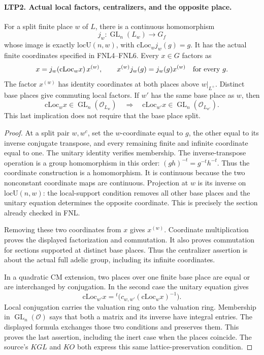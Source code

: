 \paragraph{LTP2. Actual local factors, centralizers, and the opposite place.}
\label{claim:LTP2}
For a split finite place \(w\) of \(L\), there is a continuous
homomorphism
\[
       j_w:\operatorname{GL}_n(L_w)\longrightarrow G_f
\]
whose image is exactly \(\mathrm{locU}(n,w)\), with
\(\mathrm{cLoc}_w j_w(g)=g\).  It has the actual finite coordinates
specified in FNL4--FNL6.  Every \(x\in G\) factors as
\[
       x=j_w(\mathrm{cLoc}_w x)\,x^{(w)},
             \qquad x^{(w)}j_w(g)=j_w(g)x^{(w)}
                                     \quad\hbox{for every }g.
\]
The factor \(x^{(w)}\) has identity coordinates at both places above
\(w|_{L^+}\).  Distinct base places give commuting local factors.
If \(w'\) has the same base place as \(w\), then
\[
 \mathrm{cLoc}_w x\in\operatorname{GL}_n(\mathcal O_{L_w})
 \quad\Longrightarrow\quad
 \mathrm{cLoc}_{w'}x\in\operatorname{GL}_n(\mathcal O_{L_{w'}}).
\]
This last implication does not require that the base place split.
\begin{proof}
At a split pair \(w,w^c\), set the \(w\)-coordinate equal to \(g\),
the other equal to its inverse conjugate transpose, and every
remaining finite and infinite coordinate equal to one.  The unitary
identity verifies membership.  The inverse-transpose operation is
a group homomorphism in this order:
\((gh)^{-t}=g^{-t}h^{-t}\).  Thus the coordinate construction is a
homomorphism.  It is continuous because the two nonconstant
coordinate maps are continuous.  Projection at \(w\) is its inverse
on \(\mathrm{locU}(n,w)\): the local-support condition removes all
other base places and the unitary equation determines the opposite
coordinate.  This is precisely the section already checked in FNL.

Removing these two coordinates from \(x\) gives \(x^{(w)}\).
Coordinate multiplication proves the displayed factorization and
commutation.  It also proves commutation for sections supported at
distinct base places.  Thus the centralizer assertion is about the
actual full adelic group, including its infinite coordinates.

In a quadratic CM extension, two places over one finite base place
are equal or are interchanged by conjugation.  In the second case
the unitary equation gives
\[
 \mathrm{cLoc}_{w'}x
       ={}^t\!\bigl(c_{w,w'}(\mathrm{cLoc}_w x)^{-1}\bigr).
\]
Local conjugation carries the valuation ring onto the valuation
ring.  Membership in \(\operatorname{GL}_n(\mathcal O)\) says that
both a matrix and its inverse have integral entries.  The displayed
formula exchanges those two conditions and preserves them.
This proves the last assertion, including the inert case when the
places coincide.  The source's \(KGL\) and \(KO\) both express this
same lattice-preservation condition.
\end{proof}

